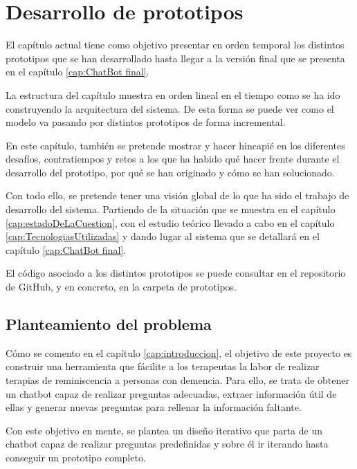 \chapter{Desarrollo de prototipos}
\label{cap:Desarrollo de prototipos}


El capítulo actual tiene como objetivo presentar en orden temporal los distintos prototipos que se han desarrollado hasta llegar a la versión final que se presenta en el capítulo \ref{cap:ChatBot final}. 

La estructura del capítulo  muestra en orden lineal en el tiempo como se ha ido construyendo la arquitectura del sistema. De esta forma se puede ver como el modelo va pasando por distintos prototipos de forma incremental. 

En este capítulo, también se pretende mostrar y hacer hincapié en los diferentes desafíos, contratiempos y retos a los que ha habido qué hacer frente durante el desarrollo del prototipo, por qué se han originado y cómo se han solucionado. 

Con todo ello, se pretende tener una visión global de lo que ha sido el trabajo de desarrollo del sistema. Partiendo de la situación que se muestra en el capítulo \ref{cap:estadoDeLaCuestion}, con el estudio teórico llevado a cabo en el capítulo \ref{cap:TecnologiasUtilizadas} y dando lugar al sistema que se detallará en el capítulo \ref{cap:ChatBot final}. 

El código asociado a los distintos prototipos se puede consultar en el repositorio de GitHub, y en concreto, en la carpeta de prototipos. 

\section{Planteamiento del problema}
Cómo se comento en el capítulo \ref{cap:introduccion}, el objetivo de este proyecto es construir una herramienta que fácilite a los terapeutas la labor de realizar terapias de reminiscencia a personas con demencia. Para ello, se trata de obtener un chatbot capaz de realizar preguntas adecuadas, extraer información útil de ellas y generar nuevas preguntas para rellenar la información faltante. 

Con este objetivo en mente, se plantea un diseño iterativo que parta de un chatbot capaz de realizar preguntas predefinidas y sobre él ir iterando hasta conseguir un prototipo completo.
